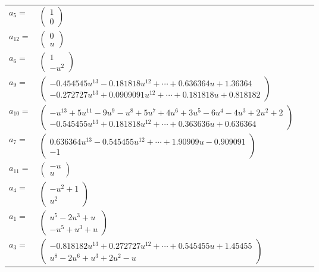 \documentclass[1p]{elsarticle_modified}
\theoremstyle{definition}
\begin{document}
\begin{tabular}{m{7pt} m{180pt} m{7pt} m{180pt} }
\flushright $a_{5}=$&$\begin{pmatrix}1\\0\end{pmatrix}$ \\
\flushright $a_{12}=$&$\begin{pmatrix}0\\u\end{pmatrix}$ \\
\flushright $a_{6}=$&$\begin{pmatrix}1\\- u^2\end{pmatrix}$ \\
\flushright $a_{9}=$&$\begin{pmatrix}-0.454545 u^{13}-0.181818 u^{12}+\cdots+0.636364 u+1.36364\\-0.272727 u^{13}+0.0909091 u^{12}+\cdots+0.181818 u+0.818182\end{pmatrix}$ \\
\flushright $a_{10}=$&$\begin{pmatrix}- u^{13}+5 u^{11}-9 u^9- u^8+5 u^7+4 u^6+3 u^5-6 u^4-4 u^3+2 u^2+2\\-0.545455 u^{13}+0.181818 u^{12}+\cdots+0.363636 u+0.636364\end{pmatrix}$ \\
\flushright $a_{7}=$&$\begin{pmatrix}0.636364 u^{13}-0.545455 u^{12}+\cdots+1.90909 u-0.909091\\-1\end{pmatrix}$ \\
\flushright $a_{11}=$&$\begin{pmatrix}- u\\u\end{pmatrix}$ \\
\flushright $a_{4}=$&$\begin{pmatrix}- u^2+1\\u^2\end{pmatrix}$ \\
\flushright $a_{1}=$&$\begin{pmatrix}u^5-2 u^3+u\\- u^5+u^3+u\end{pmatrix}$ \\
\flushright $a_{3}=$&$\begin{pmatrix}-0.818182 u^{13}+0.272727 u^{12}+\cdots+0.545455 u+1.45455\\u^8-2 u^6+u^3+2 u^2- u\end{pmatrix}$ \\

\end{tabular}
\end{document}
